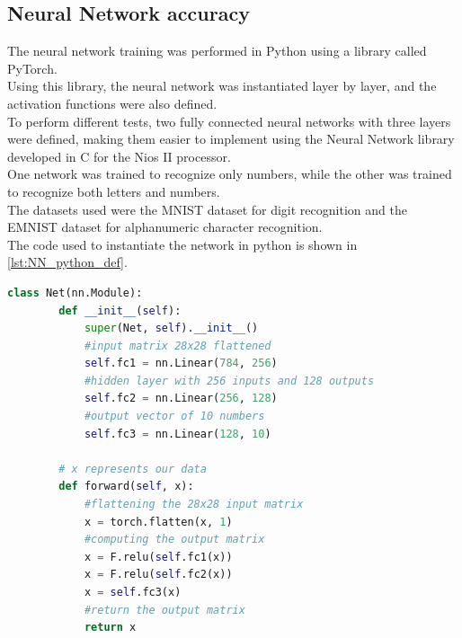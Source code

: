 \subsection{Neural Network accuracy}
\label{sssec:nn_accuracy_tst}

The neural network training was performed in Python using a library called PyTorch. \\
Using this library, the neural network was instantiated layer by layer, and the activation functions were also defined. \\
To perform different tests, two fully connected neural networks with three layers were defined, making them easier to implement using the Neural Network library developed in C for the Nios II processor. \\
One network was trained to recognize only numbers, while the other was trained to recognize both letters and numbers. \\
The datasets used were the MNIST dataset for digit recognition and the EMNIST dataset for alphanumeric character recognition. \\
The code used to instantiate the network in python is shown in \autoref{lst:NN_python_def}.

\vspace{1em}
\begin{lstlisting}[language=python, caption={MNIST letter recognition neural network definition in python using PyTorch}, label={lst:NN_python_def}]
    class Net(nn.Module):
        def __init__(self):
            super(Net, self).__init__()
            #input matrix 28x28 flattened
            self.fc1 = nn.Linear(784, 256)
            #hidden layer with 256 inputs and 128 outputs
            self.fc2 = nn.Linear(256, 128)
            #output vector of 10 numbers
            self.fc3 = nn.Linear(128, 10)
    
        # x represents our data
        def forward(self, x):
            #flattening the 28x28 input matrix
            x = torch.flatten(x, 1)
            #computing the output matrix
            x = F.relu(self.fc1(x))
            x = F.relu(self.fc2(x))
            x = self.fc3(x) 
            #return the output matrix
            return x
\end{lstlisting}

